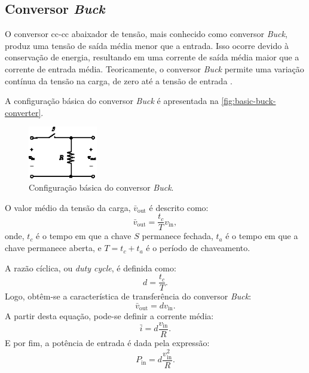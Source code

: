 \subsection{Conversor \textit{Buck}} \label{section:buck_converter}

O conversor \acrshort{cc}-\acrshort{cc} abaixador de tensão, mais conhecido como conversor \textit{Buck}, produz uma tensão de saída média menor que a entrada. Isso ocorre devido à conservação de energia, resultando em uma corrente de saída média maior que a corrente de entrada média. Teoricamente, o conversor \textit{Buck} permite uma variação contínua da tensão na carga, de zero até a tensão de entrada \citep{martins2008}.

A configuração básica do conversor \textit{Buck} é apresentada na \autoref{fig:basic-buck-converter}.

\begin{figure}[H]
  \centering
  \includegraphics[width=0.27\textwidth]{figuras/basic_buck_conversor.eps}
  \caption{Configuração básica do conversor \textit{Buck}.}
  \label{fig:basic-buck-converter}
\end{figure}

O valor médio da tensão da carga, $\bar{v}_{\mathrm{out}}$ é descrito como: \begin{equation} \bar{v}_{\mathrm{out}} = \frac{t_c}{T}v_{\mathrm{in}}, \end{equation} onde, $t_c$ é o tempo em que a chave $S$ permanece fechada, $t_a$ é o tempo em que a chave permanece aberta, e $T = t_c + t_a$ é o período de chaveamento. 

A razão cíclica, ou \textit{duty cycle}, é definida como: \begin{equation} d = \frac{t_c}{T}. \end{equation} Logo, obtêm-se a característica de transferência do conversor \textit{Buck}: \begin{equation} \bar{v}_{\mathrm{out}} = dv_{\mathrm{in}}. \label{eq:buck_feature}\end{equation} A partir desta equação, pode-se definir a corrente média: \begin{equation} \bar{i} = d\frac{v_{\mathrm{in}}}{R}. \end{equation} E por fim, a potência de entrada é dada pela expressão: \begin{equation} P_{\mathrm{in}} = d \frac{v_{\mathrm{in}}^2}{R}. \end{equation}

